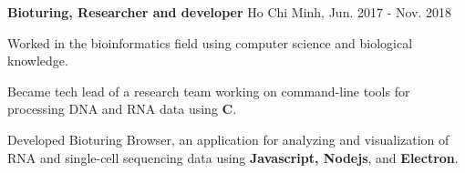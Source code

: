 \begin{cventries}
  \cvsimpleentry
    {\textbf{Bioturing, Researcher and developer}} %
    {Ho Chi Minh, Jun. 2017 - Nov. 2018} %
    {
      \begin{cvitems} %
        \item {Worked in the bioinformatics field using computer science and biological knowledge.}
        \item {Became tech lead of a research team working on command-line tools for processing DNA and RNA data using \textbf{C}.}
        \item {Developed Bioturing Browser, an application for analyzing and visualization of RNA and single-cell sequencing data using \textbf{Javascript, Nodejs}, and \textbf{Electron}.}
      \end{cvitems}
    }

\end{cventries}
